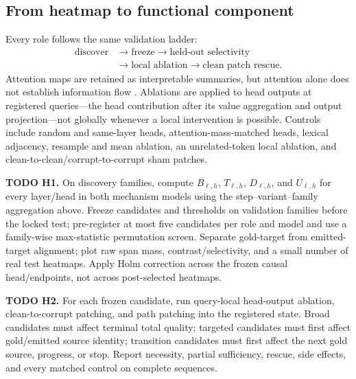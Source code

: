 \documentclass[10pt,twocolumn]{article}
\newcommand{\todoid}[2]{%
  \par\noindent\textcolor{red!75!black}{\textbf{TODO #1.} #2}\par}
\begin{document}
\subsection{From heatmap to functional component}
Every role follows the same validation ladder:
\[
\begin{aligned}
\text{discover} &\rightarrow \text{freeze}
                 \rightarrow \text{held-out selectivity}\\
                &\rightarrow \text{local ablation}
                 \rightarrow \text{clean patch rescue}.
\end{aligned}
\]
Attention maps are retained as interpretable summaries, but attention alone does not establish
information flow \citep{zhang2024patching}. Ablations are applied to head outputs at registered
queries---the head contribution after its value aggregation and output projection---not globally
whenever a local intervention is possible. Controls include random and same-layer heads,
attention-mass-matched heads, lexical adjacency, resample and mean ablation, an unrelated-token
local ablation, and clean-to-clean/corrupt-to-corrupt sham patches.

\todoid{H1}{On discovery families, compute $B_{\ell,h}$, $T_{\ell,h}$,
$D_{\ell,h}$, and $U_{\ell,h}$ for every layer/head in both mechanism models using the
step--variant--family aggregation above. Freeze candidates and thresholds on
validation families before the locked test; pre-register at most five candidates per role and
model and use a family-wise max-statistic permutation screen. Separate gold-target from
emitted-target alignment; plot raw span mass, contrast/selectivity, and a small number of real
test heatmaps. Apply Holm correction across the frozen causal head/endpoints, not across
post-selected heatmaps.}

\todoid{H2}{For each frozen candidate, run query-local head-output ablation, clean-to-corrupt
patching, and path patching into the registered state. Broad candidates must affect terminal
total quality; targeted candidates must first affect gold/emitted source identity; transition
candidates must first affect the next gold source, progress, or stop. Report necessity, partial
sufficiency, rescue, side effects, and every matched control on complete sequences.}
\end{document}
